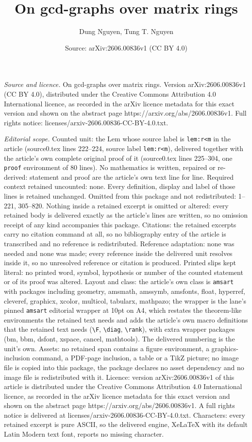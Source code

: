 \documentclass[10pt,a4paper]{amsart}
\title[On gcd-graphs over matrix rings]{On gcd-graphs over matrix rings}
\author{Dung Nguyen, Tung T. Nguyen}
\date{Source: arXiv:2606.00836v1 (CC BY 4.0)}
\begin{document}
\maketitle

\noindent\emph{Source and licence.} On gcd-graphs over matrix rings. Version arXiv:2606.00836v1 (CC BY 4.0), distributed under the Creative Commons Attribution 4.0 International licence, as recorded in the arXiv licence metadata for this exact version and shown on the abstract page https://arxiv.org/abs/2606.00836v1. Full rights notice: licenses/arxiv-2606.00836-CC-BY-4.0.txt.\par\smallskip

\noindent\textit{Editorial scope.} Counted unit: the Lem whose source label is \texttt{lem:r<m} in the article (source0.tex lines 222--224, source label \texttt{lem:r<m}), delivered together with the article's own complete original proof of it (source0.tex lines 225--304, one \texttt{proof} environment of 80 lines). No mathematics is written, repaired or re-derived: statement and proof are the article's own text line for line. Required context retained uncounted: none. Every definition, display and label of those lines is retained unchanged. Omitted from this package and not redistributed: 1--221, 305--820. Nothing inside a retained excerpt is omitted or altered: every retained body is delivered exactly as the article's lines are written, so no omission receipt of any kind accompanies this package. Citations: the retained excerpts carry no citation command at all, so no bibliography entry of the article is transcribed and no reference is redistributed. Reference adaptation: none was needed and none was made; every reference inside the delivered unit resolves inside it, so no unresolved reference or citation is produced. Printed slips kept literal: no printed word, symbol, hypothesis or number of the counted statement or of its proof was altered. Layout and class: the article's own class is \texttt{amsart} with packages including geometry, amsmath, amssymb, amsfonts, float, hyperref, cleveref, graphicx, xcolor, multicol, tabularx, mathpazo; the wrapper is the lane's pinned \texttt{amsart} editorial wrapper at 10pt on A4, which restates the theorem-like environments the retained text needs and adds the article's own macro definitions that the retained text needs (\texttt{\textbackslash F}, \texttt{\textbackslash diag}, \texttt{\textbackslash rank}), with extra wrapper packages (bm, bbm, dsfont, xspace, cancel, mathtools). The delivered numbering is the unit's own. Assets: no retained span contains a figure environment, a graphics-inclusion command, a PDF-page inclusion, a table or a TikZ picture; no image file is copied into this package, the package declares no asset dependency and no image file is redistributed with it. Licence: version arXiv:2606.00836v1 of this article is distributed under the Creative Commons Attribution 4.0 International licence, as recorded in the arXiv licence metadata for this exact version and shown on the abstract page https://arxiv.org/abs/2606.00836v1. A full rights notice is delivered at licenses/arxiv-2606.00836-CC-BY-4.0.txt. Characters: every retained excerpt is pure ASCII, so the delivered engine, XeLaTeX with its default Latin Modern text font, reports no missing character.
\end{document}
